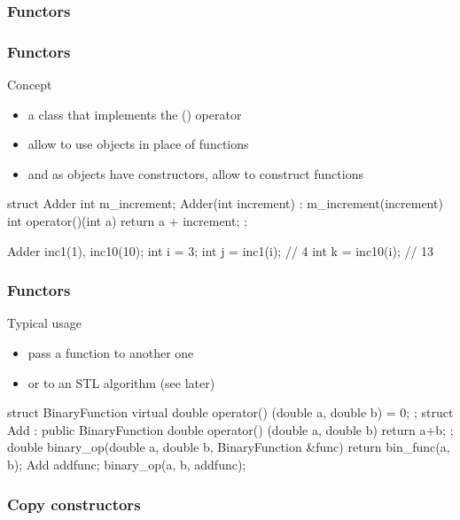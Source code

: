 \subsubsection{Functors}

\begin{frame}[fragile]
  \frametitle{Functors}
  \begin{block}{Concept}
    \begin{itemize}
    \item a class that implements the () operator
    \item allow to use objects in place of functions
    \item and as objects have constructors, allow to construct functions
    \end{itemize}
  \end{block}
  \begin{cppcode*}{}
    struct Adder {
      int m_increment;
      Adder(int increment) : m_increment(increment) {}
      int operator()(int a) { return a + increment; }
    };
    
    Adder inc1(1), inc10(10);
    int i = 3;
    int j = inc1(i);  // 4
    int k = inc10(i); // 13
  \end{cppcode*}
\end{frame}

\begin{frame}[fragile]
  \frametitle{Functors}
  \begin{block}{Typical usage}
    \begin{itemize}
    \item pass a function to another one
    \item or to an STL algorithm (see later)
    \end{itemize}
  \end{block}
  \begin{cppcode*}{}
    struct BinaryFunction {
      virtual double operator() (double a, double b) = 0;
    };
    struct Add : public BinaryFunction {
      double operator() (double a, double b) { return a+b; }
    };
    double binary_op(double a, double b, BinaryFunction &func) {
      return bin_func(a, b);
    }
    Add addfunc;
    binary_op(a, b, addfunc);
  \end{cppcode*}
\end{frame}


\subsubsection{Copy constructors}

